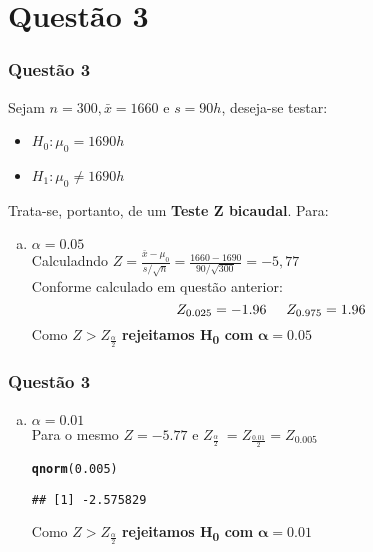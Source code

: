\documentclass{beamer}\usepackage[]{graphicx}\usepackage[]{color}
\makeatletter
\newcommand{\hlnum}[1]{\textcolor[rgb]{0.686,0.059,0.569}{#1}}%
\newcommand{\hlstd}[1]{\textcolor[rgb]{0.345,0.345,0.345}{#1}}%
\newcommand{\hlkwd}[1]{\textcolor[rgb]{0.737,0.353,0.396}{\textbf{#1}}}%
\newenvironment{kframe}{%
 \def\at@end@of@kframe{}%
 \ifinner\ifhmode%
  \def\at@end@of@kframe{\end{minipage}}%
  \begin{minipage}{\columnwidth}%
 \fi\fi%
 \def\FrameCommand##1{\hskip\@totalleftmargin \hskip-\fboxsep
 \colorbox{shadecolor}{##1}\hskip-\fboxsep
     \hskip-\linewidth \hskip-\@totalleftmargin \hskip\columnwidth}%
 \MakeFramed {\advance\hsize-\width
   \@totalleftmargin\z@ \linewidth\hsize
   \@setminipage}}%
 {\par\unskip\endMakeFramed%
 \at@end@of@kframe}
\newenvironment{knitrout}{}{} %
\makeatother
\begin{document}
	\section{Questão 3}
	\begin{frame}
			\frametitle{Questão 3}
			Sejam $n = 300, \bar{x} = 1660$ e $s = 90h$, deseja-se testar:
			\begin{itemize}
				\item $H_{0}:  \mu_{0} = 1690h$
				\item $H_{1}:  \mu_{0} \neq 1690h$
			\end{itemize}
			Trata-se, portanto, de um \textbf{Teste Z bicaudal}.  Para:
			\begin{enumerate}[(a)]
				\item $\alpha = 0.05$\\
				Calculadndo $Z = \frac{\bar{x} - \mu_{0}}{s/\sqrt{n}} = \frac{1660-1690}{90/\sqrt{300}} = -5,77$\\
				Conforme calculado em questão anterior:$$Z_{0.025} = -1.96 \hspace{0.5cm}Z_{0.975} = 1.96$$ 
				Como $ Z > Z_{\frac{\alpha}{2}}$ \textbf{rejeitamos H\textsubscript{0} com} $\boldsymbol{\alpha = 0.05}$  
			\end{enumerate}
		\end{frame}
		
		\begin{frame}[fragile]
			\frametitle{Questão 3}
			\begin{enumerate}[(b)]
				\item $\alpha = 0.01$\\
				Para o mesmo $Z = -5.77$ e $Z_{\frac{\alpha}{2}} \ = Z_{\frac{0.01}{2}} = Z_{0.005} $
\begin{knitrout}
\color{fgcolor}\begin{kframe}
\begin{alltt}
\hlkwd{qnorm}\hlstd{(}\hlnum{0.005}\hlstd{)}
\end{alltt}
\begin{verbatim}
## [1] -2.575829
\end{verbatim}
\end{kframe}
\end{knitrout}
			Como $Z > Z_{\frac{\alpha}{2} }$ \textbf{rejeitamos H\textsubscript{0} com} $\boldsymbol{\alpha = 0.01}$
			\end{enumerate}
		\end{frame}
\end{document}
